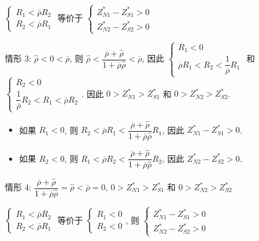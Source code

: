 \documentclass[10.0pt]{article}
\begin{document}
$ \left\{ \begin{matrix} R_1 < \overline{\rho} R_2 \\ R_2 < \overline{\rho} R_1 \end{matrix} \right. $ 等价于 $ \left\{ \begin{matrix} Z_{N 1}^* - Z_{S 1}^* > 0 \\ Z_{N 2}^* - Z_{S 2}^* > 0 \end{matrix} \right. $

情形 3: $ {\hat \rho} < 0 < \overline{\rho} $, 则 $ {\hat \rho} < \dfrac{\overline{\rho} + {\hat \rho}}{1 + \overline{\rho} {\hat \rho}} < \overline{\rho} $, 因此 $ \left\{ \begin{matrix} R_1 < 0 \\ \overline{\rho} R_1 < R_2 < \dfrac{1}{\overline{\rho}} R_1 \end{matrix} \right. $ 和 $ \left\{ \begin{matrix} R_2 < 0 \\ \dfrac{1}{\overline{\rho}} R_2 < R_1 < \overline{\rho} R_2 \end{matrix} \right. $.
因此 $ 0 > Z_{N 1}^* > Z_{S 1}^* $ 和 $ 0 > Z_{N 2}^* > Z_{S 2}^* $.
\begin{itemize}
\item 如果 $ R_1 < 0 $, 则 $ R_2 < \overline{\rho} R_1 < \dfrac{\overline{\rho} + {\hat \rho}}{1 + \overline{\rho} {\hat \rho}} R_1 $, 因此 $ Z_{N 1}^* - Z_{S 1}^* > 0 $.
\item 如果 $ R_2 < 0 $, 则 $ R_1 < \overline{\rho} R_2 < \dfrac{\overline{\rho} + {\hat \rho}}{1 + \overline{\rho} {\hat \rho}} R_2 $, 因此 $ Z_{N 2}^* - Z_{S 2}^* > 0 $.
\end{itemize}

情形 4: $ \dfrac{\overline{\rho} + {\hat \rho}}{1 + \overline{\rho} {\hat \rho}} = {\hat \rho} < \overline{\rho} = 0 $, $ 0 > Z_{N 1}^* > Z_{S 1}^* $ 和 $ 0 > Z_{N 2}^* > Z_{S 2}^* $

$ \left\{ \begin{matrix} R_1 < \overline{\rho} R_2 \\ R_2 < \overline{\rho} R_1 \end{matrix} \right. $ 等价于 $ \left\{ \begin{matrix} R_1 < 0 \\ R_2 < 0 \end{matrix} \right. $, 则 $ \left\{ \begin{matrix} Z_{N 1}^* - Z_{S 1}^* > 0 \\ Z_{N 2}^* - Z_{S 2}^* > 0 \end{matrix} \right. $
\end{document}
